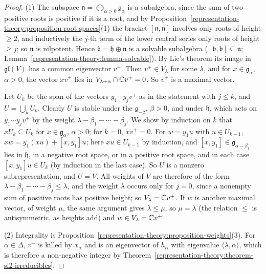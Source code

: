 \begin{proof}
(1) The subspace $\mathfrak{n} = \bigoplus_{\alpha > 0}\mathfrak{g}_\alpha$ is a subalgebra, since the sum of two positive roots is positive if it is a root, and by
Proposition~\ref{representation-theory:proposition-root-spaces}(1) the bracket $[\mathfrak{n}, \mathfrak{n}]$ involves only roots of height $\geq 2$, and inductively the $j$-th term of the
lower central series only roots of height $\geq j$; so $\mathfrak{n}$ is nilpotent. Hence $\mathfrak{b} = \mathfrak{h} \oplus \mathfrak{n}$ is a solvable subalgebra ($[\mathfrak{b},
\mathfrak{b}] \subseteq \mathfrak{n}$; Lemma~\ref{representation-theory:lemma-solvable}). By Lie's theorem its image in $\mathfrak{gl}(V)$ has a common eigenvector $v^+$. Then
$v^+ \in V_\lambda$ for some $\lambda$, and for $x \in \mathfrak{g}_\alpha$, $\alpha > 0$, the vector $xv^+$ lies in $V_{\lambda + \alpha} \cap \mathbb{C} v^+ = 0$. So $v^+$ is a maximal vector.

Let $U_k$ be the span of the vectors $y_1\cdots y_jv^+$ as in the statement with $j \leq k$, and $U = \bigcup_kU_k$. Clearly $U$ is stable under the $\mathfrak{g}_{-\beta}$, $\beta > 0$, and
under $\mathfrak{h}$, which acts on $y_1\cdots y_jv^+$ by the weight $\lambda - \beta_1 - \cdots - \beta_j$. We show by induction on $k$ that $xU_k \subseteq U_k$ for
$x \in \mathfrak{g}_\alpha$, $\alpha > 0$; for $k = 0$, $xv^+ = 0$. For $w = y_1u$ with $u \in U_{k-1}$, $xw = y_1(xu) + [x, y_1]u$; here $xu \in U_{k-1}$ by induction, and
$[x, y_1] \in \mathfrak{g}_{\alpha - \beta_1}$ lies in $\mathfrak{h}$, in a negative root space, or in a positive root space, and in each case $[x, y_1]u \in U_k$ (by induction in
the last case). So $U$ is a nonzero subrepresentation, and $U = V$. All weights of $V$ are therefore of the form $\lambda - \beta_1 - \cdots - \beta_j \leq \lambda$, and the weight
$\lambda$ occurs only for $j = 0$, since a nonempty sum of positive roots has positive height; so $V_\lambda = \mathbb{C} v^+$. If $w$ is another maximal vector, of weight $\mu$, the same
argument gives $\lambda \leq \mu$, so $\mu = \lambda$ (the relation $\leq$ is antisymmetric, as heights add) and $w \in V_\lambda = \mathbb{C} v^+$.

(2) Integrality is Proposition~\ref{representation-theory:proposition-weights}(3). For $\alpha \in \Delta$, $v^+$ is killed by $x_\alpha$ and is an eigenvector of $h_\alpha$ with
eigenvalue $\langle\lambda, \alpha\rangle$, which is therefore a non-negative integer by Theorem~\ref{representation-theory:theorem-sl2-irreducibles}.


\end{proof}
